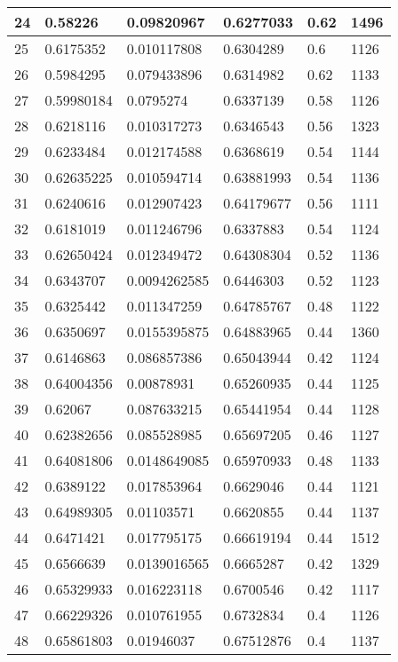 \begin{longtable}{|l|l|l|l|l|l|}
24 & 0.58226 & 0.09820967 & 0.6277033 & 0.62 & 1496 \\ \hline 
25 & 0.6175352 & 0.010117808 & 0.6304289 & 0.6 & 1126 \\ \hline 
26 & 0.5984295 & 0.079433896 & 0.6314982 & 0.62 & 1133 \\ \hline 
27 & 0.59980184 & 0.0795274 & 0.6337139 & 0.58 & 1126 \\ \hline 
28 & 0.6218116 & 0.010317273 & 0.6346543 & 0.56 & 1323 \\ \hline 
29 & 0.6233484 & 0.012174588 & 0.6368619 & 0.54 & 1144 \\ \hline 
30 & 0.62635225 & 0.010594714 & 0.63881993 & 0.54 & 1136 \\ \hline 
31 & 0.6240616 & 0.012907423 & 0.64179677 & 0.56 & 1111 \\ \hline 
32 & 0.6181019 & 0.011246796 & 0.6337883 & 0.54 & 1124 \\ \hline 
33 & 0.62650424 & 0.012349472 & 0.64308304 & 0.52 & 1136 \\ \hline 
34 & 0.6343707 & 0.0094262585 & 0.6446303 & 0.52 & 1123 \\ \hline 
35 & 0.6325442 & 0.011347259 & 0.64785767 & 0.48 & 1122 \\ \hline 
36 & 0.6350697 & 0.0155395875 & 0.64883965 & 0.44 & 1360 \\ \hline 
37 & 0.6146863 & 0.086857386 & 0.65043944 & 0.42 & 1124 \\ \hline 
38 & 0.64004356 & 0.00878931 & 0.65260935 & 0.44 & 1125 \\ \hline 
39 & 0.62067 & 0.087633215 & 0.65441954 & 0.44 & 1128 \\ \hline 
40 & 0.62382656 & 0.085528985 & 0.65697205 & 0.46 & 1127 \\ \hline 
41 & 0.64081806 & 0.0148649085 & 0.65970933 & 0.48 & 1133 \\ \hline 
42 & 0.6389122 & 0.017853964 & 0.6629046 & 0.44 & 1121 \\ \hline 
43 & 0.64989305 & 0.01103571 & 0.6620855 & 0.44 & 1137 \\ \hline 
44 & 0.6471421 & 0.017795175 & 0.66619194 & 0.44 & 1512 \\ \hline 
45 & 0.6566639 & 0.0139016565 & 0.6665287 & 0.42 & 1329 \\ \hline 
46 & 0.65329933 & 0.016223118 & 0.6700546 & 0.42 & 1117 \\ \hline 
47 & 0.66229326 & 0.010761955 & 0.6732834 & 0.4 & 1126 \\ \hline 
48 & 0.65861803 & 0.01946037 & 0.67512876 & 0.4 & 1137 \\ \hline 

\end{longtable}
